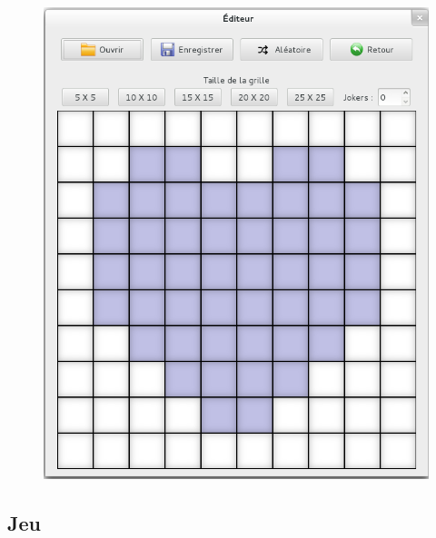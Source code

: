 \documentclass[a4paper, 12pt, twoside]{article}
\begin{document}
\begin{figure}[H]
  \center
  \includegraphics[scale=0.6]{editeur.png}

  \label{editeur}
\end{figure}
\newpage
\subsection{Jeu}
\end{document}
